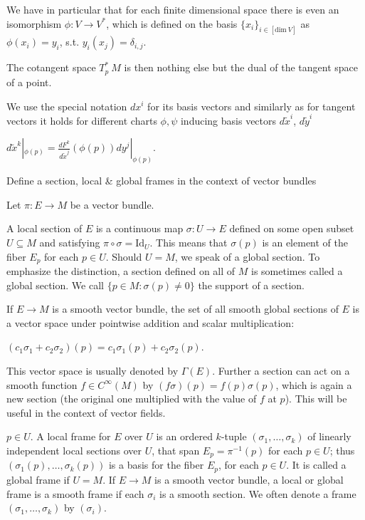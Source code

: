 We have in particular that for each finite dimensional space there is even an isomorphism \(\phi : V \to V^\ast \),
which is defined on the basis \( \{x_i\}_{i \in [\text{dim}\ V]} \) as \( \phi(x_i) = y_i \), s.t. \( y_i(x_j) = \delta_{i,j} \).

The cotangent space \( T^\ast_p\ M \) is then nothing else but the dual of the tangent space of a point.

We use the special notation \( dx^i \) for its basis vectors and similarly as for tangent vectors it holds for different
charts \( \phi, \psi \) inducing basis vectors \( d\tilde{x}^i \), \( d\tilde{y}^i \)

\( d\tilde{x}^k|_{\phi(p)} = \frac{dF^k}{d\tilde{x}^j}(\phi(p))dy^j|_{\phi(p)} \).


Define a section, local & global frames in the context of vector bundles

Let \(\pi: E \to M\) be a vector bundle. 

A local section of \(E\) is a continuous map \(\sigma: U \to E\) defined on some open subset \(U \subseteq M\) 
and satisfying \(\pi \circ \sigma = \text{Id}_U\). 
This means that \(\sigma(p)\) is an element of the fiber \(E_p\) for each \(p \in U\).
Should \( U = M \), we speak of a global section.
To emphasize the distinction, a section defined on all of \(M\) is sometimes called a global section.
We call \( \{ p \in M : \sigma(p) \neq 0 \} \) the support of a section.

If \(E \to M\) is a smooth vector bundle, 
the set of all smooth global sections of \(E\) is a vector space 
under pointwise addition and scalar multiplication:

\((c_1 \sigma_1 + c_2 \sigma_2)(p) = c_1 \sigma_1(p) + c_2 \sigma_2(p)\).

This vector space is usually denoted by \(\Gamma(E)\).
Further a section can act on a smooth function \( f \in C^{\infty}(M) \) by
\( (f\sigma)(p) = f(p)\sigma(p) \), which is again a new section (the original one multiplied with the value of \( f \) at \( p \)).
This will be useful in the context of vector fields.

\(p \in U\). 
A local frame for \(E\) over \(U\) is an ordered \(k\)-tuple \((\sigma_1, \dots, \sigma_k)\) of linearly independent local sections over \(U\),
that span \(E_p = \pi^{-1}(p)\) for each \( p \in U\); 
thus \((\sigma_1(p), \dots, \sigma_k(p))\) is a basis for the fiber \(E_p\), for each \(p \in U\). 
It is called a global frame if \(U = M\). If \(E \to M\) is a smooth vector bundle, 
a local or global frame is a smooth frame if each \(\sigma_i\) is a smooth section. 
We often denote a frame \((\sigma_1, \dots, \sigma_k)\) by \((\sigma_i)\).

